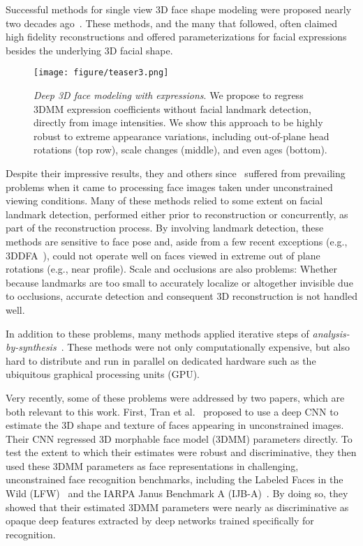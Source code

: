 \documentclass[a4paper, 10pt, conference]{ieeeconf}
\begin{document}
Successful methods for single view 3D face shape modeling were proposed nearly two decades ago~\cite{blanz2002face,blanz2003face,paysan09basel,romdhani2003efficient}. These methods, and the many that followed, often claimed high fidelity reconstructions and offered parameterizations for facial expressions besides the underlying 3D facial shape. 

 \begin{figure}[tb]
 \centering
 \texttt{[image: figure/teaser3.png]}
 \caption{
 {\em Deep 3D face modeling with expressions}. We propose to regress 3DMM expression coefficients without facial landmark detection, directly from image intensities. We show this approach to be highly robust to extreme appearance variations, including out-of-plane head rotations (top row), scale changes (middle), and even ages (bottom).
 }
 \label{fig:teaser}
 \end{figure}

Despite their impressive results, they and others since~\cite{blanz2002face,blanz2003face,chu2014,paysan09basel,romdhani2003efficient,tang2008real,yang2011expression} suffered from prevailing problems when it came to processing face images taken under unconstrained viewing conditions. Many of these methods relied to some extent on facial landmark detection, performed either prior to reconstruction or concurrently, as part of the reconstruction process. By involving landmark detection, these methods are sensitive to face pose and, aside from a few recent exceptions (e.g., 3DDFA~\cite{zhu2015}), could not operate well on faces viewed in extreme out of plane rotations (e.g., near profile). Scale and occlusions are also problems: Whether because landmarks are too small to accurately localize or altogether invisible due to occlusions, accurate detection and consequent 3D reconstruction is not handled well. 

In addition to these problems, many methods applied iterative steps of {\em analysis-by-synthesis}~\cite{Bas:accvw16,huber:3dmm,romdhani2005estimating}. These methods were not only computationally expensive, but also hard to distribute and run in parallel on dedicated hardware such as the ubiquitous graphical processing units (GPU). 


Very recently, some of these problems were addressed by two papers, which are both relevant to this work. First, Tran et al.~\cite{tran16_3dmm_cnn} proposed to use a deep CNN to estimate the 3D shape and texture of faces appearing in unconstrained images. Their CNN regressed 3D morphable face model (3DMM) parameters directly. To test the extent to which their estimates were robust and discriminative, they then used these 3DMM parameters as face representations in challenging, unconstrained face recognition benchmarks, including the Labeled Faces in the Wild (LFW)~\cite{LFWTech} and the IARPA Janus Benchmark A (IJB-A)~\cite{Klare_2015_CVPR}. By doing so, they showed that their estimated 3DMM parameters were nearly as discriminative as opaque deep features extracted by deep networks trained specifically for recognition. 
\end{document}
